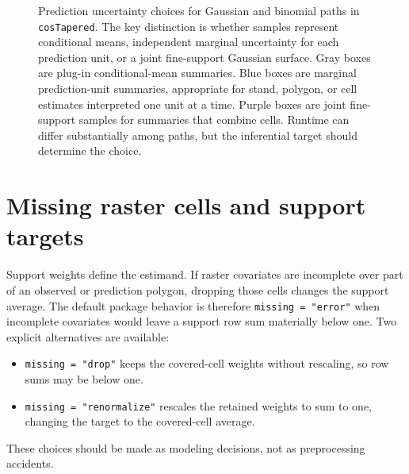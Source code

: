 \documentclass[11pt]{article}
\begin{document}
\begin{figure}[p]
{
}
\caption{Prediction uncertainty choices for Gaussian and binomial paths in
\texttt{cosTapered}. The key distinction is whether samples represent
conditional means, independent marginal uncertainty for each prediction unit,
or a joint fine-support Gaussian surface. Gray boxes are plug-in
conditional-mean summaries. Blue boxes are marginal prediction-unit summaries,
appropriate for stand, polygon, or cell estimates interpreted one unit at a
time. Purple boxes are joint fine-support samples for summaries that combine
cells. Runtime can differ substantially among paths, but the inferential
target should determine the choice.}
\label{fig:prediction_decision}
\end{figure}
\clearpage

\section{Missing raster cells and support targets}

Support weights define the estimand. If raster covariates are incomplete over
part of an observed or prediction polygon, dropping those cells changes the
support average. The default package behavior is therefore
\texttt{missing = "error"} when incomplete covariates would leave a support
row sum materially below one. Two explicit alternatives are available:
\begin{itemize}
\item \texttt{missing = "drop"} keeps the covered-cell weights without
  rescaling, so row sums may be below one.
\item \texttt{missing = "renormalize"} rescales the retained weights to sum to
  one, changing the target to the covered-cell average.
\end{itemize}
These choices should be made as modeling decisions, not as preprocessing
accidents.
\end{document}
